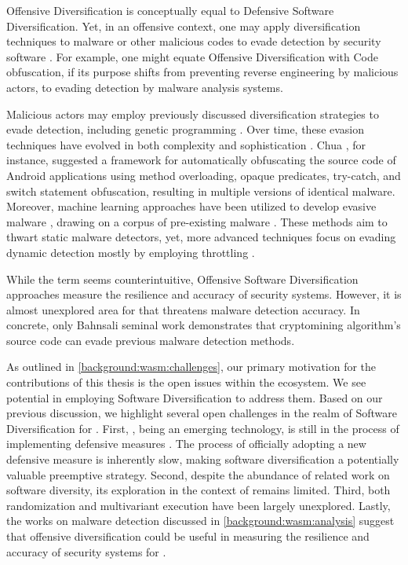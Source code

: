 \begin{strategy}   
    Offensive Diversification is conceptually equal to Defensive Software Diversification.
    Yet, in an offensive context, one may apply diversification techniques to malware or other malicious codes to evade detection by security software \cite{8714698}.
    For example, one might equate Offensive Diversification with Code obfuscation, if its purpose shifts from preventing reverse engineering by malicious actors, to evading detection by malware analysis systems.
    
\end{strategy}


Malicious actors may employ previously discussed diversification strategies to evade detection, including genetic programming \cite{castro2019aimed}.
Over time, these evasion techniques have evolved in both complexity and sophistication \cite{Aghakhani2020WhenMI}.
Chua \etal \cite{chua}, for instance, suggested a framework for automatically obfuscating the source code of Android applications using method overloading, opaque predicates, try-catch, and switch statement obfuscation, resulting in multiple versions of identical malware.
Moreover, machine learning approaches have been utilized to develop evasive malware \cite{2021arXiv211111487D}, drawing on a corpus of pre-existing malware \cite{Bostani2021EvadeDroidAP}.
These methods aim to thwart static malware detectors, yet, more advanced techniques focus on evading dynamic detection mostly by employing throttling \cite{Lu2013WeaknessesID, payer2014embracing}.


While the term seems counterintuitive, Offensive Software Diversification approaches measure the resilience and accuracy of security systems.
However, it is almost unexplored area for \Wasm that threatens malware detection accuracy.
In concrete, only Bahnsali \etal seminal work\cite{10.1145/3507657.3528560} demonstrates that cryptomining algorithm's source code can evade previous malware detection methods.


\label{sota:openchallenges}
As outlined in \autoref{background:wasm:challenges}, our primary motivation for the contributions of this thesis is the open issues within the \Wasm ecosystem. 
We see potential in employing Software Diversification to address them. 
Based on our previous discussion, we highlight several open challenges in the realm of Software Diversification for \Wasm. 
First, \Wasm, being an emerging technology, is still in the process of implementing defensive measures \cite{Stevienart paper here}. 
The process of officially adopting a new defensive measure is inherently slow, making software diversification a potentially valuable preemptive strategy. 
Second, despite the abundance of related work on software diversity, its exploration in the context of \Wasm remains limited. 
Third, both randomization and multivariant execution have been largely unexplored. 
Lastly, the works on malware detection discussed in \autoref{background:wasm:analysis} suggest that offensive diversification could be useful in measuring the resilience and accuracy of security systems for \Wasm.





